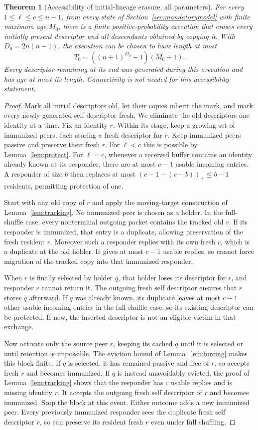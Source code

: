 \documentclass[11pt]{article}
\newtheorem{theorem}{Theorem}
\begin{document}
\begin{theorem}[Accessibility of initial-lineage erasure, all parameters]
\label{thm:lineages}
For every $1\le\ell\le c\le n-1$, from every state of
Section~\ref{sec:mandatorymodel} with finite
maximum age $M_0$, there is a finite positive-probability execution
that erases every initially present descriptor and all descendants
obtained by copying it. With $D_0=2n(n-1)$, the execution can be
chosen to have length at most
\[
 T_0=((n+1)^{D_0}-1)(M_0+1).
\]
Every descriptor remaining at its end was generated during this
execution and has age at most its length.
Connectivity is not needed for this accessibility statement.
\end{theorem}
\begin{proof}
Mark all initial descriptors old, let their copies inherit the
mark, and mark every newly generated self descriptor fresh.
We eliminate the old descriptors one identity at a time.
Fix an identity $r$. Within its stage, keep a growing set of
immunized peers, each storing a fresh descriptor for $r$.
Keep immunized peers passive and preserve their fresh $r$.
For $\ell<c$ this is possible by Lemma~\ref{lem:protect}.
For $\ell=c$, whenever a received buffer contains an identity
already known at its responder, there are at most $c-1$ usable
incoming entries. A responder of size $b$ then replaces at most
$(c-1-(c-b))_+\le b-1$ residents, permitting protection of one.

Start with any old copy of $r$ and apply the moving-target
construction of Lemma~\ref{lem:tracking}.
No immunized peer is chosen as a holder. In the full-shuffle
case, every nonterminal outgoing packet contains the tracked
old $r$. If its responder is immunized, that entry is a
duplicate, allowing preservation of the fresh resident $r$.
Moreover such a responder replies with its own fresh $r$,
which is a duplicate at the old holder. It gives at most $c-1$
usable replies, so cannot force migration of the tracked copy
into that immunized responder.

When $r$ is finally selected by holder $q$, that holder loses
its descriptor for $r$, and responder $r$ cannot return it.
The outgoing fresh self descriptor ensures that $r$ stores $q$
afterward. If $q$ was already known, its duplicate leaves at
most $c-1$ other usable incoming entries in the full-shuffle
case, so its existing descriptor can be protected. If new,
the inserted descriptor is not an eligible victim in that exchange.

Now activate only the source peer $r$, keeping its cached $q$
until it is selected or until retention is impossible.
The eviction bound of Lemma~\ref{lem:forcing} makes this block
finite. If $q$ is selected, it has remained passive and free
of $r$, so accepts fresh $r$ and becomes immunized.
If $q$ is instead unavoidably evicted, the proof of
Lemma~\ref{lem:tracking} shows that the responder has $c$
usable replies and is missing identity $r$. It accepts the
outgoing fresh self descriptor of $r$ and becomes immunized.
Stop the block at this event. Either outcome adds a new
immunized peer. Every previously immunized responder sees the
duplicate fresh self descriptor $r$, so can preserve its resident
fresh $r$ even under full shuffling.


\end{proof}
\end{document}
